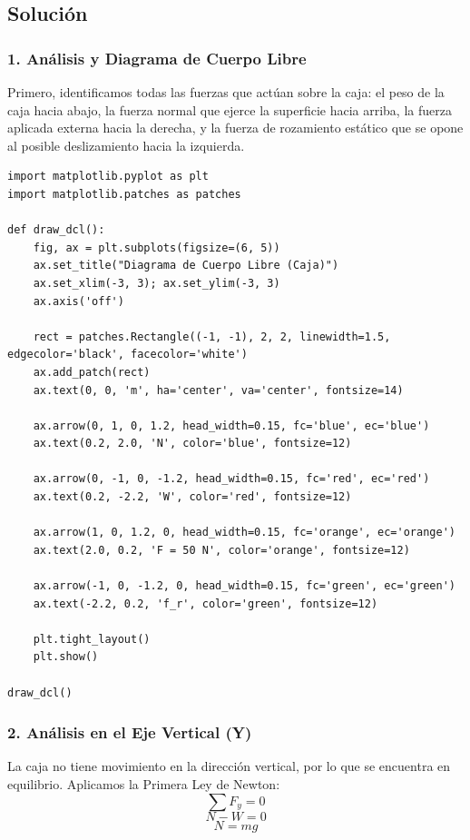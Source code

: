 \documentclass[12pt, a4paper]{article}
\begin{document}
\subsection*{Solución}

\subsubsection*{1. Análisis y Diagrama de Cuerpo Libre}
Primero, identificamos todas las fuerzas que actúan sobre la caja: el peso de la caja hacia abajo, la fuerza normal que ejerce la superficie hacia arriba, la fuerza aplicada externa hacia la derecha, y la fuerza de rozamiento estático que se opone al posible deslizamiento hacia la izquierda.

\begin{lstlisting}
import matplotlib.pyplot as plt
import matplotlib.patches as patches

def draw_dcl():
    fig, ax = plt.subplots(figsize=(6, 5))
    ax.set_title("Diagrama de Cuerpo Libre (Caja)")
    ax.set_xlim(-3, 3); ax.set_ylim(-3, 3)
    ax.axis('off')

    rect = patches.Rectangle((-1, -1), 2, 2, linewidth=1.5, edgecolor='black', facecolor='white')
    ax.add_patch(rect)
    ax.text(0, 0, 'm', ha='center', va='center', fontsize=14)

    ax.arrow(0, 1, 0, 1.2, head_width=0.15, fc='blue', ec='blue')
    ax.text(0.2, 2.0, 'N', color='blue', fontsize=12)

    ax.arrow(0, -1, 0, -1.2, head_width=0.15, fc='red', ec='red')
    ax.text(0.2, -2.2, 'W', color='red', fontsize=12)

    ax.arrow(1, 0, 1.2, 0, head_width=0.15, fc='orange', ec='orange')
    ax.text(2.0, 0.2, 'F = 50 N', color='orange', fontsize=12)

    ax.arrow(-1, 0, -1.2, 0, head_width=0.15, fc='green', ec='green')
    ax.text(-2.2, 0.2, 'f_r', color='green', fontsize=12)

    plt.tight_layout()
    plt.show()

draw_dcl()
\end{lstlisting}

\subsubsection*{2. Análisis en el Eje Vertical (Y)}
La caja no tiene movimiento en la dirección vertical, por lo que se encuentra en equilibrio. Aplicamos la Primera Ley de Newton:
$$ \sum F_y = 0 $$
$$ N - W = 0 $$
$$ N = m g $$
\end{document}

